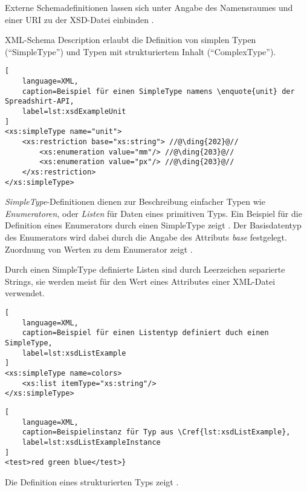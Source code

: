Externe Schemadefinitionen lassen sich unter Angabe des Namensraumes und einer \gls{URI} zu der \gls{XSD}-Datei einbinden .

\gls{XML}-Schema Description erlaubt die Definition von simplen Typen (\enquote{SimpleType}) und Typen mit strukturiertem Inhalt (\enquote{ComplexType}).

\begin{lstlisting}[
    language=XML,
    caption=Beispiel für einen SimpleType namens \enquote{unit} der Spreadshirt-API,
    label=lst:xsdExampleUnit
]
<xs:simpleType name="unit">
    <xs:restriction base="xs:string"> //@\ding{202}@//
        <xs:enumeration value="mm"/> //@\ding{203}@//
        <xs:enumeration value="px"/> //@\ding{203}@//
    </xs:restriction>
</xs:simpleType>
\end{lstlisting}

\emph{SimpleType}-Definitionen dienen zur Beschreibung einfacher Typen wie \emph{Enumeratoren}, oder \emph{Listen} für Daten eines primitiven Typs. Ein Beispiel für die Definition eines Enumerators durch einen SimpleType zeigt . Der Basisdatentyp des Enumerators wird dabei durch die Angabe des Attributs \emph{base}  festgelegt. Zuordnung von Werten zu dem Enumerator zeigt .

Durch einen SimpleType definierte Listen sind durch Leerzeichen separierte Strings, sie werden meist für den Wert eines Attributes einer \gls{XML}-Datei verwendet. 

\begin{lstlisting}[
    language=XML,
    caption=Beispiel für einen Listentyp definiert duch einen SimpleType,
    label=lst:xsdListExample    
]
<xs:simpleType name=colors>
    <xs:list itemType="xs:string"/>
</xs:simpleType>
\end{lstlisting}

\begin{lstlisting}[
    language=XML,
    caption=Beispielinstanz für Typ aus \Cref{lst:xsdListExample},
    label=lst:xsdListExampleInstance
]
<test>red green blue</test>}
\end{lstlisting}

Die Definition eines strukturierten Typs zeigt .

